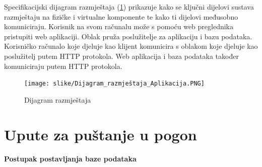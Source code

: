 			 Specifikacijski dijagram razmještaja (\ref{fig:dijagram_razmjestaja1}) prikazuje kako se ključni dijelovi sustava razmještaju na fizičke i virtualne komponente te kako ti dijelovi međusobno komuniciraju.
			 Korisnik na svom računalu može s pomoću web preglednika pristupiti web aplikaciji. Oblak pruža poslužitelje za aplikaciju i bazu podataka. Korisničko računalo koje djeluje kao klijent komunicira s oblakom koje djeluje kao poslužitelj putem HTTP protokola. Web aplikacija i baza podataka također komuniciraju putem HTTP protokola.
			 
			 \begin{figure}[H]
				\texttt{[image: slike/Dijagram\_razmještaja\_Aplikacija.PNG]} %
				\centering
				\caption{Dijagram razmještaja}
				\label{fig:dijagram_razmjestaja1}
			\end{figure}
			
			\eject 
		
		\section{Upute za puštanje u pogon}
	

\textbf{Postupak postavljanja baze podataka}

